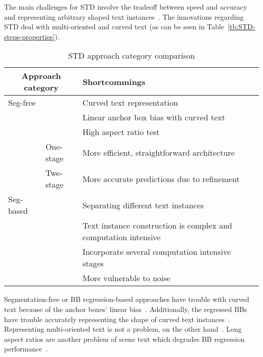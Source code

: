The main challenges for \ac{STD} involve the tradeoff between speed and accuracy and
representing arbitrary shaped text instances~\citep{wang_efficient_2019}.
The innovations regarding \ac{STD} deal with multi-oriented and curved text (as can be seen in
Table~\ref{tb:STD-steps-properties}).
\begin{table}[h]
    \centering\scriptsize
    \begin{tabular}{p{}p{}p{}}
        \multicolumn{2}{c}{\textbf{Approach category}} & \textbf{Shortcommings} \\
        \toprule
        Seg-free & & Curved text representation~\citep{long_scene_2021,wang_shape_2019} \\
        & & Linear anchor box bias with curved text~\citep{wang_shape_2019,ferrari_textsnake_2018} \\
        & & High aspect ratio test~\citep{shi_detecting_2017,long_scene_2021} \\
        & One-stage & More efficient, straightforward architecture~\citep{lu_mimicdet_2020} \\
        & Twe-stage & More accurate predictions due to refinement~\citep{lu_mimicdet_2020} \\
        \midrule
        Seg-based & & Separating different text instances~\citep{wang_shape_2019} \\
        & & Text instance construction is complex and computation
            intensive~\citep{xie_aggregation_2019,liao_real-time_2019,qiao_text_2021} \\
        & & Incorporate several computation intensive stages~\citep{dai_fused_2018} \\
        & & More vulnerable to noise~\citep{long_scene_2021} \\
        \bottomrule
    \end{tabular}
    \caption{STD approach category comparison\label{tb:STD-comparison}}
\end{table}
Segmentation-free or \ac{BB} regression-based approaches have trouble with curved text because of
the anchor boxes' linear bias~\citep{wang_shape_2019,ferrari_textsnake_2018}.
Additionally, the regressed \acp{BB} have trouble accurately representing the shape of curved
text instances~\citep{long_scene_2021,wang_shape_2019}.
Representing multi-oriented text is not a problem, on the other
hand~\citep{liao_textboxes_2018,jiang_r2cnn_2017}.
Long aspect ratios are another problem of scene text which degrades \ac{BB} regression
performance~\citep{shi_detecting_2017,long_scene_2021}.

